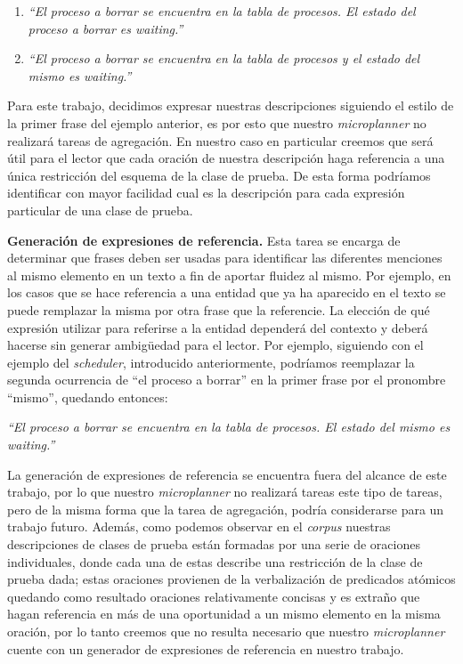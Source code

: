 \begin{center}
\begin{enumerate}
  \item \emph{``El proceso a borrar se encuentra en la tabla de procesos. El estado del proceso a borrar es waiting.''} 
  \item \emph{``El proceso a borrar se encuentra en la tabla de procesos y el estado del mismo es waiting.''}
\end{enumerate}
\end{center}

\medskip
\noindent
Para este trabajo, decidimos expresar nuestras descripciones siguiendo el estilo de la primer frase del ejemplo anterior, es por esto que nuestro \textit{microplanner} no realizará tareas de agregación. En nuestro caso en particular creemos que será útil para el lector que cada oración de nuestra descripción haga referencia a una única restricción del esquema de la clase de prueba. De esta forma podríamos identificar con mayor facilidad cual es la descripción para cada expresión particular de una clase de prueba.


\medskip
\noindent
\textbf{Generación de expresiones de referencia.} Esta tarea se encarga de determinar que frases deben ser usadas para identificar las diferentes menciones al mismo elemento en un texto a fin de aportar fluidez al mismo. Por ejemplo, en los casos que se hace referencia a una entidad que ya ha aparecido en el texto se puede remplazar la misma por otra frase que la referencie. La elección de qué expresión utilizar para referirse a la entidad dependerá del contexto y deberá hacerse sin generar ambigüedad para el lector. Por ejemplo, siguiendo con el ejemplo del \emph{scheduler}, introducido anteriormente, podríamos reemplazar la segunda ocurrencia de ``el proceso a borrar'' en la primer frase por el pronombre ``mismo'', quedando entonces:

\smallskip
\begin{center}
\emph{``El proceso a borrar se encuentra en la tabla de procesos. El estado del mismo es waiting.''} 
\end{center}

\smallskip
La generación de expresiones de referencia se encuentra fuera del alcance de este trabajo, por lo que nuestro \textit{microplanner} no realizará tareas este tipo de tareas, pero de la misma forma que la tarea de agregación, podría considerarse para un trabajo futuro. Además, como podemos observar en el \emph{corpus} nuestras descripciones de clases de prueba están formadas por una serie de oraciones individuales, donde cada una de estas describe una restricción de la clase de prueba dada; estas oraciones provienen de la verbalización de predicados atómicos quedando como resultado oraciones relativamente concisas y es extraño que hagan referencia en más de una oportunidad a un mismo elemento en la misma oración, por lo tanto creemos que no resulta necesario que nuestro \textit{microplanner} cuente con un generador de expresiones de referencia en nuestro trabajo.

